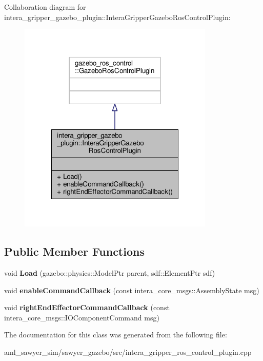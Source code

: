 Collaboration diagram for intera\-\_\-gripper\-\_\-gazebo\-\_\-plugin\-:\-:Intera\-Gripper\-Gazebo\-Ros\-Control\-Plugin\-:\nopagebreak
\begin{figure}[H]
\begin{center}
\leavevmode
\includegraphics[width=264pt]{classintera__gripper__gazebo__plugin_1_1_intera_gripper_gazebo_ros_control_plugin__coll__graph}
\end{center}
\end{figure}
\subsection*{Public Member Functions}
\begin{DoxyCompactItemize}
\item 
\hypertarget{classintera__gripper__gazebo__plugin_1_1_intera_gripper_gazebo_ros_control_plugin_a8f4923c7fac9574158ef48fe5fb602b3}{void {\bfseries Load} (gazebo\-::physics\-::\-Model\-Ptr parent, sdf\-::\-Element\-Ptr sdf)}\label{classintera__gripper__gazebo__plugin_1_1_intera_gripper_gazebo_ros_control_plugin_a8f4923c7fac9574158ef48fe5fb602b3}

\item 
\hypertarget{classintera__gripper__gazebo__plugin_1_1_intera_gripper_gazebo_ros_control_plugin_a4f52a44cd216dcf0c92e3ae5af5cbfc4}{void {\bfseries enable\-Command\-Callback} (const intera\-\_\-core\-\_\-msgs\-::\-Assembly\-State msg)}\label{classintera__gripper__gazebo__plugin_1_1_intera_gripper_gazebo_ros_control_plugin_a4f52a44cd216dcf0c92e3ae5af5cbfc4}

\item 
\hypertarget{classintera__gripper__gazebo__plugin_1_1_intera_gripper_gazebo_ros_control_plugin_affda6050383c8b1f6ccdffd98fa688c2}{void {\bfseries right\-End\-Effector\-Command\-Callback} (const intera\-\_\-core\-\_\-msgs\-::\-I\-O\-Component\-Command msg)}\label{classintera__gripper__gazebo__plugin_1_1_intera_gripper_gazebo_ros_control_plugin_affda6050383c8b1f6ccdffd98fa688c2}

\end{DoxyCompactItemize}


The documentation for this class was generated from the following file\-:\begin{DoxyCompactItemize}
\item 
aml\-\_\-sawyer\-\_\-sim/sawyer\-\_\-gazebo/src/intera\-\_\-gripper\-\_\-ros\-\_\-control\-\_\-plugin.\-cpp\end{DoxyCompactItemize}
